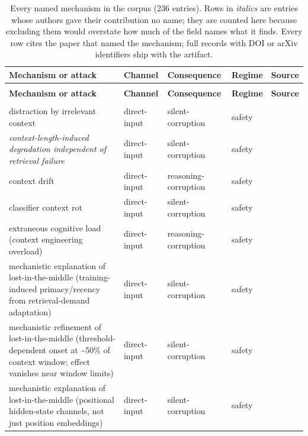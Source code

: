 \begingroup
\footnotesize
\setlength{\tabcolsep}{3.5pt}
\begin{longtable}{@{}>{\raggedright\arraybackslash}p{}llll@{}}
\caption{Every named mechanism in the corpus (236 entries). Rows in \emph{italics} are entries whose authors gave their contribution no name; they are counted here because excluding them would overstate how much of the field names what it finds. Every row cites the paper that named the mechanism; full records with DOI or arXiv identifiers ship with the artifact.}\\
\toprule
\textbf{Mechanism or attack} & \textbf{Channel} & \textbf{Consequence} & \textbf{Regime} & \textbf{Source} \\
\midrule
\endfirsthead
\multicolumn{5}{l}{\emph{Table~\ref{tab:census-mech}: named mechanisms, continued}} \\
\toprule
\textbf{Mechanism or attack} & \textbf{Channel} & \textbf{Consequence} & \textbf{Regime} & \textbf{Source} \\
\midrule
\endhead
\midrule
\multicolumn{5}{r}{\emph{continued}} \\
\endfoot
\bottomrule
\endlastfoot
distraction by irrelevant context & direct-input & silent-corruption & safety & \cite{shi-2023-large} \\
\emph{context-length-induced degradation independent of retrieval failure} & direct-input & silent-corruption & safety & \cite{du-2025-context} \\
context drift & direct-input & reasoning-corruption & safety & \cite{dongre-2025-drift} \\
classifier context rot & direct-input & silent-corruption & safety & \cite{martin-2026-classifier} \\
extraneous cognitive load (context engineering overload) & direct-input & reasoning-corruption & safety & \cite{shang-2025-united} \\
mechanistic explanation of lost-in-the-middle (training-induced primacy/recency from retrieval-demand adaptation) & direct-input & silent-corruption & safety & \cite{salvatore-2025-lost} \\
mechanistic refinement of lost-in-the-middle (threshold-dependent onset at \textasciitilde{}50\% of context window; effect vanishes near window limits) & direct-input & silent-corruption & safety & \cite{veseli-2025-positional} \\
mechanistic explanation of lost-in-the-middle (positional hidden-state channels, not just position embeddings) & direct-input & silent-corruption & safety & \cite{yu-2024-mitigate} \\

\end{longtable}
